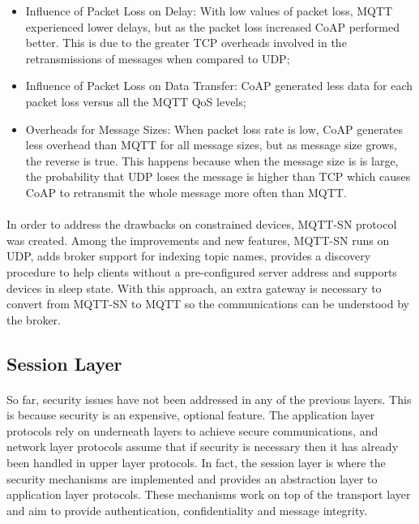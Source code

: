 \begin{itemize}
	\item Influence of Packet Loss on Delay: With low values of packet loss, \gls{MQTT} experienced lower delays, but as the packet loss increased \gls{CoAP} performed better. This is due to the greater \gls{TCP} overheads involved in the retransmissions of messages when compared to \gls{UDP};\\
	\item Influence of Packet Loss on Data Transfer: \gls{CoAP} generated less data for each packet loss versus all the \gls{MQTT} \gls{QoS} levels;\\
	\item Overheads for Message Sizes: When packet loss rate is low, \gls{CoAP} generates less overhead than \gls{MQTT} for all message sizes, but as message size grows, the reverse is true. This happens because when the message size is is large, the probability that \gls{UDP} loses the message is higher than \gls{TCP} which causes \gls{CoAP} to retransmit the whole message more often than \gls{MQTT}.
\end{itemize}

\paragraph{}
	In order to address the drawbacks on constrained devices, \gls{MQTT-SN} protocol \cite{Ibm2013} was created. Among the improvements and new features, \gls{MQTT-SN} runs on UDP, adds broker support for indexing topic names, provides a discovery procedure to help clients without a pre-configured server address and supports devices in sleep state. With this approach, an extra gateway is necessary to convert from \gls{MQTT-SN} to \gls{MQTT} so the communications can be understood by the broker.

\subsection{Session Layer}

\paragraph{}
So far, security issues have not been addressed in any of the previous layers. This is because security is an expensive, optional feature. The application layer protocols rely on underneath layers to achieve secure communications, and network layer protocols assume that if security is necessary then it has already been handled in upper layer protocols. In fact, the session layer is where the security mechanisms are implemented and provides an abstraction layer to application layer protocols. These mechanisms work on top of the transport layer and aim to provide authentication, confidentiality and message integrity.

